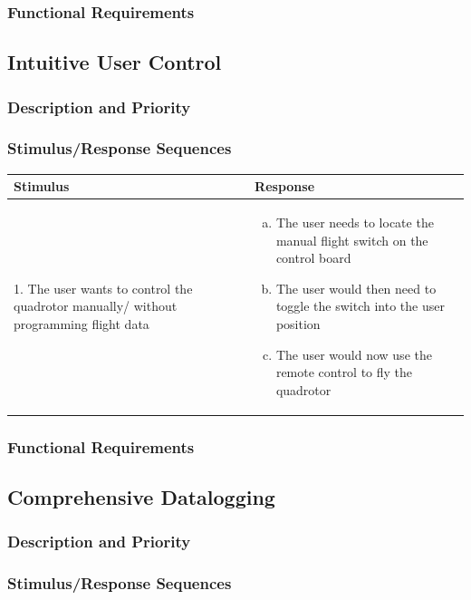 \documentclass[english]{article}
\numberwithin{equation}{section} %
\begin{document}
\subsubsection{Functional Requirements}
\bigskip
\subsection{Intuitive User Control}
\subsubsection{Description and Priority}
\subsubsection{Stimulus/Response Sequences}

\begin{longtable}{p{3cm} | p{10cm}}
\hline
\textbf{Stimulus} & \textbf{Response}\\
\hline
1. The user wants to control the quadrotor manually/ without programming flight data &
\begin{enumerate}[(a)]\itemsep1pt %
\item The user needs to locate the manual flight switch on the control board
\item The user would then need to toggle the switch into the user position
\item The user would now use the remote control to fly the quadrotor
\end{enumerate}
\\ 
\hline
\end{longtable}



\subsubsection{Functional Requirements}
\bigskip
\subsection{Comprehensive Datalogging}
\subsubsection{Description and Priority}
\subsubsection{Stimulus/Response Sequences}
\end{document}
